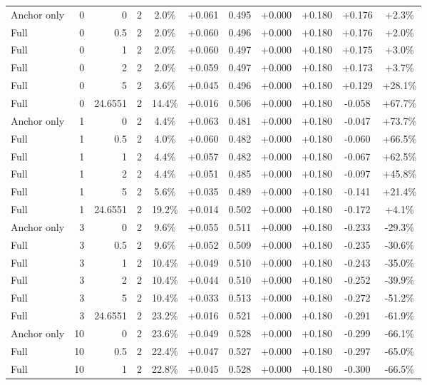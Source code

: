 \begin{table}[htbp]
\begin{tabular}{lrrrccccccc}
Anchor only & 0 & 0 & 2 & 2.0\% & +0.061 & 0.495 & +0.000 & +0.180 & +0.176 & +2.3\% \\
Full & 0 & 0.5 & 2 & 2.0\% & +0.060 & 0.496 & +0.000 & +0.180 & +0.176 & +2.0\% \\
Full & 0 & 1 & 2 & 2.0\% & +0.060 & 0.497 & +0.000 & +0.180 & +0.175 & +3.0\% \\
Full & 0 & 2 & 2 & 2.0\% & +0.059 & 0.497 & +0.000 & +0.180 & +0.173 & +3.7\% \\
Full & 0 & 5 & 2 & 3.6\% & +0.045 & 0.496 & +0.000 & +0.180 & +0.129 & +28.1\% \\
Full & 0 & 24.6551 & 2 & 14.4\% & +0.016 & 0.506 & +0.000 & +0.180 & -0.058 & +67.7\% \\
Anchor only & 1 & 0 & 2 & 4.4\% & +0.063 & 0.481 & +0.000 & +0.180 & -0.047 & +73.7\% \\
Full & 1 & 0.5 & 2 & 4.0\% & +0.060 & 0.482 & +0.000 & +0.180 & -0.060 & +66.5\% \\
Full & 1 & 1 & 2 & 4.4\% & +0.057 & 0.482 & +0.000 & +0.180 & -0.067 & +62.5\% \\
Full & 1 & 2 & 2 & 4.4\% & +0.051 & 0.485 & +0.000 & +0.180 & -0.097 & +45.8\% \\
Full & 1 & 5 & 2 & 5.6\% & +0.035 & 0.489 & +0.000 & +0.180 & -0.141 & +21.4\% \\
Full & 1 & 24.6551 & 2 & 19.2\% & +0.014 & 0.502 & +0.000 & +0.180 & -0.172 & +4.1\% \\
Anchor only & 3 & 0 & 2 & 9.6\% & +0.055 & 0.511 & +0.000 & +0.180 & -0.233 & -29.3\% \\
Full & 3 & 0.5 & 2 & 9.6\% & +0.052 & 0.509 & +0.000 & +0.180 & -0.235 & -30.6\% \\
Full & 3 & 1 & 2 & 10.4\% & +0.049 & 0.510 & +0.000 & +0.180 & -0.243 & -35.0\% \\
Full & 3 & 2 & 2 & 10.4\% & +0.044 & 0.510 & +0.000 & +0.180 & -0.252 & -39.9\% \\
Full & 3 & 5 & 2 & 10.4\% & +0.033 & 0.513 & +0.000 & +0.180 & -0.272 & -51.2\% \\
Full & 3 & 24.6551 & 2 & 23.2\% & +0.016 & 0.521 & +0.000 & +0.180 & -0.291 & -61.9\% \\
Anchor only & 10 & 0 & 2 & 23.6\% & +0.049 & 0.528 & +0.000 & +0.180 & -0.299 & -66.1\% \\
Full & 10 & 0.5 & 2 & 22.4\% & +0.047 & 0.527 & +0.000 & +0.180 & -0.297 & -65.0\% \\
Full & 10 & 1 & 2 & 22.8\% & +0.045 & 0.528 & +0.000 & +0.180 & -0.300 & -66.5\% \\

\end{tabular}
\end{table}
